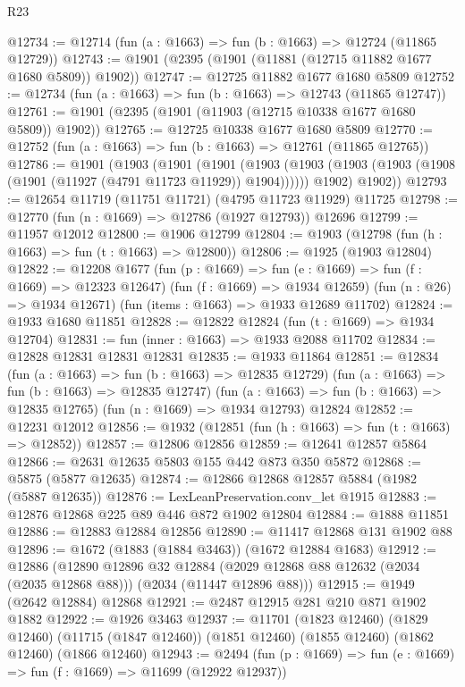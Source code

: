 \begin{lexlean}{R23}
\begin{coremodule}
@12734 := @12714 (fun (a : @1663) => fun (b : @1663) => @12724 (@11865 @12729))
@12743 := @1901 (@2395 (@1901 (@11881 (@12715 @11882 @1677 @1680 @5809)) @1902))
@12747 := @12725 @11882 @1677 @1680 @5809
@12752 := @12734 (fun (a : @1663) => fun (b : @1663) => @12743 (@11865 @12747))
@12761 := @1901 (@2395 (@1901 (@11903 (@12715 @10338 @1677 @1680 @5809)) @1902))
@12765 := @12725 @10338 @1677 @1680 @5809
@12770 := @12752 (fun (a : @1663) => fun (b : @1663) => @12761 (@11865 @12765))
@12786 := @1901
    (@1903
      (@1901
        (@1901
          (@1903 (@1903 (@1903 (@1903 (@1908 (@1901 (@11927 (@4791 @11723 @11929)) @1904))))))
          @1902)
        @1902))
@12793 := @12654 @11719 (@11751 @11721) (@4795 @11723 @11929) @11725
@12798 := @12770 (fun (n : @1669) => @12786 (@1927 @12793)) @12696
@12799 := @11957 @12012
@12800 := @1906 @12799
@12804 := @1903 (@12798 (fun (h : @1663) => fun (t : @1663) => @12800))
@12806 := @1925 (@1903 @12804)
@12822 := @12208
    @1677
    (fun (p : @1669) => fun (e : @1669) => fun (f : @1669) => @12323 @12647)
    (fun (f : @1669) => @1934 @12659)
    (fun (n : @26) => @1934 @12671)
    (fun (items : @1663) => @1933 @12689 @11702)
@12824 := @1933 @1680 @11851
@12828 := @12822 @12824 (fun (t : @1669) => @1934 @12704)
@12831 := fun (inner : @1663) => @1933 @2088 @11702
@12834 := @12828 @12831 @12831 @12831
@12835 := @1933 @11864
@12851 := @12834
    (fun (a : @1663) => fun (b : @1663) => @12835 @12729)
    (fun (a : @1663) => fun (b : @1663) => @12835 @12747)
    (fun (a : @1663) => fun (b : @1663) => @12835 @12765)
    (fun (n : @1669) => @1934 @12793)
    @12824
@12852 := @12231 @12012
@12856 := @1932 (@12851 (fun (h : @1663) => fun (t : @1663) => @12852))
@12857 := @12806 @12856
@12859 := @12641 @12857 @5864
@12866 := @2631 @12635 @5803 @155 @442 @873 @350 @5872
@12868 := @5875 (@5877 @12635)
@12874 := @12866 @12868 @12857 @5884 (@1982 (@5887 @12635))
@12876 := LexLeanPreservation.conv_let @1915
@12883 := @12876 @12868 @225 @89 @446 @872 @1902 @12804
@12884 := @1888 @11851
@12886 := @12883 @12884 @12856
@12890 := @11417 @12868 @131 @1902 @88
@12896 := @1672 (@1883 (@1884 @3463)) (@1672 @12884 @1683)
@12912 := @12886
    (@12890
      @12896
      @32
      @12884
      (@2029 @12868 @88 @12632 (@2034 (@2035 @12868 @88)))
      (@2034 (@11447 @12896 @88)))
@12915 := @1949 (@2642 @12884) @12868
@12921 := @2487 @12915 @281 @210 @871 @1902 @1882
@12922 := @1926 @3463
@12937 := @11701
    (@1823 @12460)
    (@1829 @12460)
    (@11715 (@1847 @12460))
    (@1851 @12460)
    (@1855 @12460)
    (@1862 @12460)
    (@1866 @12460)
@12943 := @2494 (fun (p : @1669) => fun (e : @1669) => fun (f : @1669) => @11699 (@12922 @12937))

\end{coremodule}
\end{lexlean}
